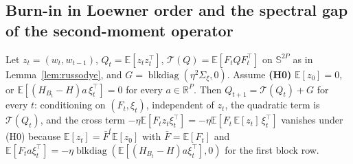 \documentclass[11pt]{article}
\theoremstyle{remark}
\newcommand{\E}{\mathbb{E}}
\newcommand{\R}{\mathbb{R}}
\begin{document}
\subsection{Burn-in in Loewner order and the spectral gap of the second-moment operator}\label{sec:burnin}

Let $z_t=(w_t,w_{t-1})$, $Q_t=\E[z_tz_t^\top]$, $\mathcal T(Q)=\E[F_tQF_t^\top]$ on $\mathbb S^{2P}$ as in Lemma~\ref{lem:russodye}, and $G=\operatorname{blkdiag}(\eta^2\Sigma_\xi,0)$. Assume
\textbf{(H0)} $\E[z_0]=0$, or $\E[(H_{B_t}-H)a\,\xi_t^\top]=0$ for every $a\in\R^P$.
Then $Q_{t+1}=\mathcal T(Q_t)+G$ for every $t$: conditioning on $(F_t,\xi_t)$, independent of $z_t$, the quadratic term is $\mathcal T(Q_t)$, and the cross term $-\eta\E[F_tz_t\xi_t^\top]=-\eta\E[F_t\,\E[z_t]\,\xi_t^\top]$ vanishes under (H0) because $\E[z_t]=\bar F^t\E[z_0]$ with $\bar F=\E[F_t]$ and $\E[F_ta\xi_t^\top]=-\eta\operatorname{blkdiag}(\E[(H_{B_t}-H)a\xi_t^\top],0)$ for the first block row.
\end{document}
